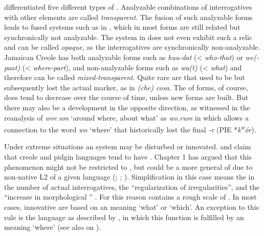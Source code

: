 \citet{MuyskenSmith1990} differentiated five different types of . Analyzable combinations of interrogatives with other elements are called \textit{transparent}. The fusion of such analyzable forms leads to fused systems such as in , which in most forms are still related but synchronically not analyzable. The system in  does not even exhibit such a relic and can be called \textit{opaque}, as the interrogatives are synchronically non-analyzable. Jamaican Creole has both analyzable forms such as \textit{huu-dat} (<  \textit{who-that}) or \textit{we(-paat)} (<  \textit{where-part}), and non-analyzable forms such as \textit{wa(t)} (<  \textit{what}) and therefore can be called \textit{mixed-transparent}. Quite rare are   that used to be  but subsequently lost the actual  marker, as in  \textit{(che) cosa}. The  of forms, of course, does tend to decrease over the course of time, unless new forms are built. But there may also be a development in the opposite direction, as witnessed in the reanalysis of \textit{wor.um} ‘around where, about what’ as \textit{wo.}\textit{rum} in  which allows a connection to the word \textit{wo} ‘where’ that historically lost the final \textit{-r} (PIE *\textit{k\textsuperscript{w}}\textit{ór}).

Under extreme  situations an  system may be disturbed or innovated. \cite[65-66]{Bickerton2016} and \citet{MuyskenSmith1990} claim that creole and pidgin languages tend to have  . Chapter 1 has argued that this phenomenon might not be restricted to , but could be a more general  of  due to non-native L2  of a given language (\citealt{McWhorter2007}; \citealt{Trudgill2011}; \citealt{Operstein2015}). Simplification in this case means the  in the number of actual interrogatives, the “regularization of irregularities”, and the “increase in morphological ” \citep[62]{Trudgill2011}. For this reason  contains a rough scale of . In most cases, innovative  are based on an  meaning ‘what’ or ‘which’. An exception to this rule is the language  as described by \citet{Cysouw2007}, in which this function is fulfilled by an  meaning ‘where’ (see also  on ).

